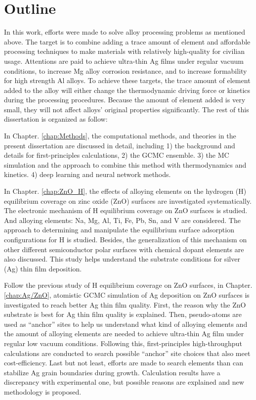 \newpage
\section{Outline}


In this work, efforts were made to solve alloy processing problems as mentioned above. The target is to combine adding a trace amount of element and affordable processing techniques to make materials with relatively high-quality for civilian usage. Attentions are paid to achieve ultra-thin Ag films under regular vacuum conditions, to increase Mg alloy corrosion resistance, and to increase formability for high strength Al alloys. To achieve these targets, the trace amount of element added to the alloy will either change the thermodynamic driving force or kinetics during the processing procedures. Because the amount of element added is very small, they will not affect alloys' original properties significantly. The rest of this dissertation is organized as follow:

In Chapter. \ref{chap:Methods}, the computational methods, and theories in the present dissertation are discussed in detail, including 1) the background and details for first-principles calculations, 2) the \acf{GCMC} ensemble. 3) the \acf{MC} simulation and the approach to combine this method with thermodynamics and kinetics. 4) deep learning and neural network methods.

In Chapter. \ref{chap:ZnO_H}, the effects of alloying elements on the hydrogen (H) equilibrium coverage on zinc oxide (ZnO) surfaces are investigated systematically. The electronic mechanism of H equilibrium coverage on ZnO surfaces is studied. And alloying elements: Na, Mg, Al, Ti, Fe, Pb, Sn, and V are considered. The approach to determining and manipulate the equilibrium surface adsorption configurations for H is studied. Besides, the generalization of this mechanism on other different semiconductor polar surfaces with chemical dopant elements are also discussed. This study helps understand the substrate conditions for silver (Ag) thin film deposition.

Follow the previous study of H equilibrium coverage on ZnO surfaces, in Chapter. \ref{chap:Ag/ZnO}, atomistic \acf{GCMC} simulation of Ag deposition on ZnO surfaces is investigated to reach better Ag thin film quality. First, the reason why the ZnO substrate is best for Ag thin film quality is explained. Then, pseudo-atoms are used as ``anchor'' sites to help us understand what kind of alloying elements and the amount of alloying elements are needed to achieve ultra-thin Ag film under regular low vacuum conditions. Following this, first-principles high-throughput calculations are conducted to search possible ``anchor'' site choices that also meet cost-efficiency. Last but not least, efforts are made to search elements than can stabilize Ag grain boundaries during growth. Calculation results have a discrepancy with experimental one, but possible reasons are explained and new methodology is proposed.


